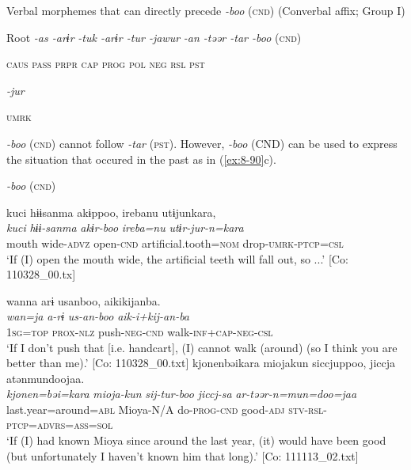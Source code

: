 \ea\label{ex:8-89}
  Verbal morphemes that can directly precede \textit{-boo} (\textsc{cnd}) (Converbal affix; Group I)

  Root  \textit{-as  -arɨr} %
\textit{-tuk  -arɨr  -tur  -jawur} %
\textit{-an  -təər  -tar  -boo} (\textsc{cnd})

    \textsc{caus}  \textsc{pass}  \textsc{prpr}  \textsc{cap}  \textsc{prog}  \textsc{pol}  \textsc{neg}  \textsc{rsl}  \textsc{pst}

          \textit{-jur}

          \textsc{umrk}
\z

\textit{-boo} (\textsc{cnd}) cannot follow \textit{-tar} (\textsc{pst}). However, \textit{-boo} (CND) can be used to express the situation that occured in the past as in (\ref{ex:8-90}c).

\ea\label{ex:8-90}
  \textit{-boo} (\textsc{cnd})

\ea
{\TM}
\glll  kuci  hɨɨsanma  akɨppoo,  {\textbar}ireba{\textbar}nu      utɨjunkara,\\
\textit{kuci}  \textit{hɨɨ-sanma}  \textit{akɨr-boo}  \textit{ireba=nu}      \textit{utɨr-jur-n=kara}\\
mouth  wide-\textsc{advz}  open-\textsc{cnd}  artificial.tooth=\textsc{nom}  drop-\textsc{umrk}-\textsc{ptcp}=\textsc{csl}\\
\glt ‘If (I) open the mouth wide, the artificial teeth will fall out, so ...’ [Co: 110328\_00.tx]



{\TM}
\glll  wanna  arɨ  usanboo,  aikikijanba.\\
\textit{wan=ja}  \textit{a-rɨ}  \textit{us-an-boo}  \textit{aik-i+kij-an-ba}\\
1\textsc{sg}=\textsc{top}  \textsc{prox}-\textsc{nlz}  push-\textsc{neg}-\textsc{cnd}  walk-\textsc{inf}+\textsc{cap}-\textsc{neg}-\textsc{csl}\\
\glt ‘If I don’t push that [i.e. handcart], (I) cannot walk (around) (so I think you are better than me).’ [Co: 110328\_00.txt]
\ex
{\TM}
\glll  {\textbar}kjonen{\textbar}bəikara  mioja{\textbar}kun{\textbar}  siccjuppoo,  jiccja      atənmundoojaa.\\
\textit{kjonen=bəi=kara}  \textit{mioja-kun}  \textit{sij-tur-boo}  \textit{jiccj-sa}    \textit{ar-təər-n=mun=doo=jaa}\\
last.year=around=\textsc{abl}  Mioya-N/A  do-\textsc{prog}-\textsc{cnd}  good-\textsc{adj}  \textsc{stv}-\textsc{rsl}-\textsc{ptcp}=\textsc{advrs}=\textsc{ass}=\textsc{sol}\\
\glt ‘If (I) had known Mioya since around the last year, (it) would have been good (but unfortunately I haven’t known him that long).’ [Co: 111113\_02.txt]


